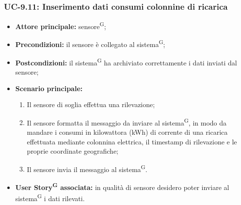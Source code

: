 \documentclass[8pt]{article}
\newcommand{\glossterm}[1]{#1\textsuperscript{G}} %
\begin{document}
\subsubsection*{UC-9.11: Inserimento dati consumi colonnine di ricarica}
\begin{itemize}
    \item \textbf{Attore principale:} \glossterm{sensore};
    \item \textbf{Precondizioni:} il sensore è collegato al \glossterm{sistema};
    \item \textbf{Postcondizioni:} il \glossterm{sistema} ha archiviato correttamente i dati inviati dal sensore;
    \item \textbf{Scenario principale:}
        \begin{enumerate}
        \item Il sensore di soglia effettua una rilevazione;
        \item Il sensore formatta il messaggio da inviare al \glossterm{sistema}, in modo da mandare i consumi in kilowattora (kWh) di corrente di una ricarica effettuata mediante colonnina elettrica, il timestamp di rilevazione e le proprie coordinate geografiche;
        \item Il sensore invia il messaggio al \glossterm{sistema}.
        \end{enumerate}
    \item \textbf{\glossterm{User Story} associata:} in qualità di sensore desidero poter inviare al \glossterm{sistema} i dati rilevati.
\end{itemize}
\end{document}
